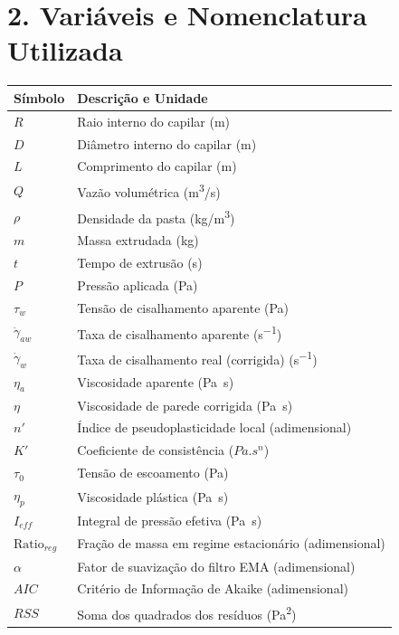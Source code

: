 \documentclass[a4paper,12pt]{article}
\begin{document}
\section*{2. Variáveis e Nomenclatura Utilizada}
\begin{center}
\begin{tabular}{@{}l l@{}}
\toprule
\textbf{Símbolo} & \textbf{Descrição e Unidade} \\
\midrule
$R$ & Raio interno do capilar (\si{m}) \\
$D$ & Diâmetro interno do capilar (\si{m}) \\
$L$ & Comprimento do capilar (\si{m}) \\
$Q$ & Vazão volumétrica (\si{m^{3}/s}) \\
$\rho$ & Densidade da pasta (\si{kg/m^{3}}) \\
$m$ & Massa extrudada (\si{kg}) \\
$t$ & Tempo de extrusão (\si{s}) \\
$P$ & Pressão aplicada (\si{Pa}) \\
$\tau_w$ & Tensão de cisalhamento aparente (\si{Pa}) \\
$\dot{\gamma}_{aw}$ & Taxa de cisalhamento aparente (\si{s^{-1}}) \\
$\dot{\gamma}_w$ & Taxa de cisalhamento real (corrigida) (\si{s^{-1}}) \\
$\eta_a$ & Viscosidade aparente (\si{Pa.s}) \\
$\eta$ & Viscosidade de parede corrigida (\si{Pa.s}) \\
$n'$ & Índice de pseudoplasticidade local (adimensional) \\
$K'$ & Coeficiente de consistência ($\si{Pa.s^n}$) \\
$\tau_0$ & Tensão de escoamento (\si{Pa}) \\
$\eta_p$ & Viscosidade plástica (\si{Pa.s}) \\
$I_{eff}$ & Integral de pressão efetiva (\si{Pa.s}) \\
$\text{Ratio}_{reg}$ & Fração de massa em regime estacionário (adimensional) \\
$\alpha$ & Fator de suavização do filtro EMA (adimensional) \\
$AIC$ & Critério de Informação de Akaike (adimensional) \\
$RSS$ & Soma dos quadrados dos resíduos (\si{Pa^2}) \\
\bottomrule
\end{tabular}
\end{center}
\end{document}
